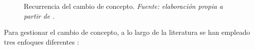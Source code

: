 \documentclass[c5paper,10pt,twoside]{book}	   	%
\begin{document}
\begin{itemize}
	\begin{figure}[!hbtp]
		\centering
		\caption[Recurrencia del cambio de concepto]{Recurrencia del cambio de concepto. \textit{Fuente: elaboración propia a partir de \cite{Rkgwh17}.}}
		\label{fig:recurrenciaCambio}
	\end{figure}
\end{itemize}

Para gestionar el cambio de concepto, a lo largo de la literatura se han empleado tres enfoques diferentes \cite{Rkgwh17}: 
\end{document}
